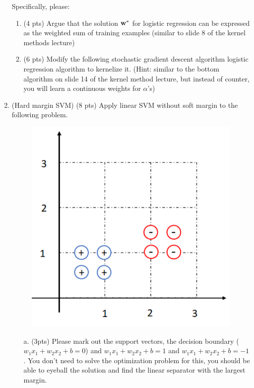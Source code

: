 \documentclass{article}
\def\w{{\bf w}}
\begin{document}
\begin{enumerate}
Specifically, please:
\begin{enumerate}
    \item (4 pts) Argue that the solution $\w^*$ for logistic regression can be expressed as the weighted sum of training examples (similar to slide 8 of the kernel methods lecture)\\
    \item (6 pts) Modify the following stochastic gradient descent algorithm logistic regression algorithm to kernelize it. (Hint: similar to the bottom algorithm on slide 14 of the kernel method lecture, but instead of counter, you will learn a continuous weights for $\alpha$'s)\\
\end{enumerate}
\newpage
\item (Hard margin SVM) (8 pts) Apply linear SVM without soft margin to the following problem.
\begin{center}
\begin{figure}[h]
    \centering
    \includegraphics[width=0.5\linewidth]{svm.pdf}
    \caption{ }
    \label{fig:enter-label}
\end{figure}
\end{center}
\begin{itemize} \item[a.] (3pts) Please mark out the support vectors, the decision boundary ($w_1x_1+w_2x_2 +b =0$) and $w_1x_1+w_2x_2+b =1$ and $w_1x_1+w_2x_2+b =-1$. You don't need to solve the optimization problem for this, you should be able to eyeball the solution and find the linear separator with the largest margin.


\end{itemize}
\end{enumerate}
\end{document}
